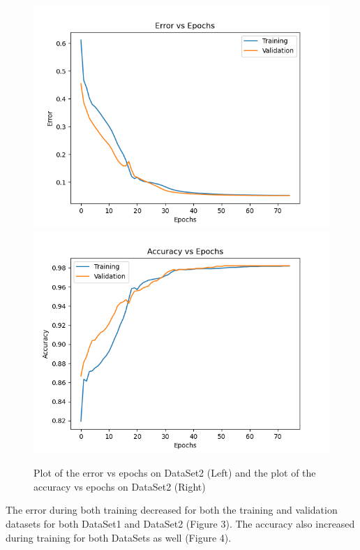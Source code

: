 \documentclass[letterpaper, 12pt]{article}
\begin{document}
\begin{figure}[H]
\centering
\includegraphics[scale = 0.5]{DataSet2ErrorPlot}
\includegraphics[scale = 0.5]{DataSet2AccuracyPlot}
\caption{Plot of the error vs epochs on DataSet2 (Left) and the plot of the accuracy vs epochs on DataSet2 (Right)}
\end{figure}

The error during both training decreased for both the training and validation datasets for both DataSet1 and DataSet2 (Figure 3).  The accuracy also increased during training for both DataSets as well (Figure 4).
\end{document}
